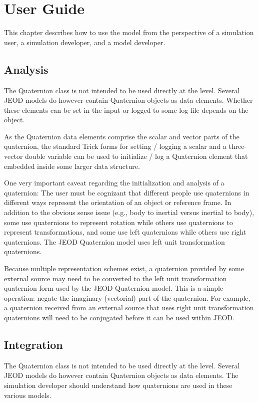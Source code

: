 \chapter{User Guide}\label{ch:user}
This chapter describes how to use the \quaternionDesc model from the
perspective of a simulation user, a simulation developer,
and a model developer.


\section{Analysis}
The Quaternion class is not intended to be used directly at the \Sdefine level.
Several JEOD models do however contain Quaternion objects as data elements.
Whether these elements can be set in the input or
logged to some log file depends on the object.

As the Quaternion data elements comprise the scalar and vector parts of the
quaternion, the standard Trick forms for setting / logging a scalar and a
three-vector double variable can be used to initialize  / log a Quaternion
element that embedded inside some larger data structure.

One very important caveat regarding the initialization and analysis of a
quaternion:
The user must be cognizant that different people use quaternions
in different ways represent the orientation of an object or reference frame.
In addition to the obvious sense issue (e.g., body to inertial versus
inertial to body), some use quaternions to represent rotation while
others use quaternions to represent transformations, and some use left
quaternions while others use right quaternions. The JEOD Quaternion model
uses left unit transformation quaternions.

Because multiple representation schemes exist, a quaternion provided by some
external source may need to be converted to the left unit transformation
quaternion form used by the JEOD Quaternion model. This is a simple
operation: negate the imaginary (vectorial) part of the quaternion.
 For example, a quaternion received from an external source that
uses right unit transformation quaternions will need to be conjugated
before it can be used within JEOD.


\section{Integration}
The Quaternion class is not intended to be used directly at the \Sdefine level.
Several JEOD models do however contain Quaternion objects as data elements.
The simulation developer should understand how quaternions are used in these
various models.

